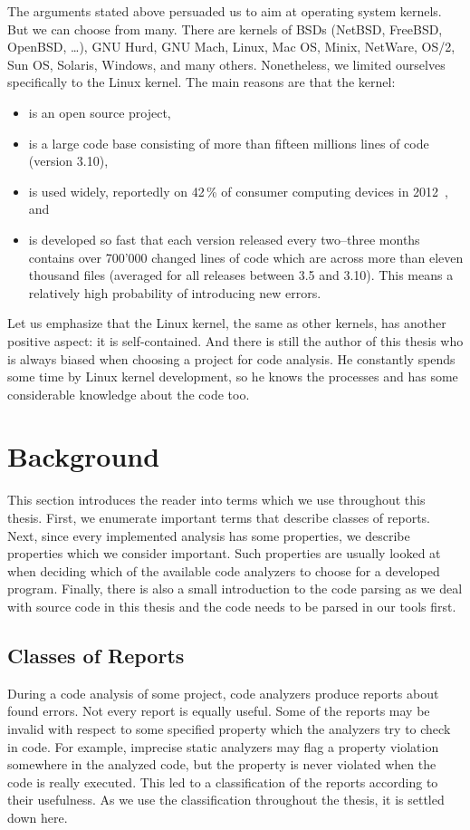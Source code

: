 The arguments stated above persuaded us to aim at operating system kernels.
But we can choose from many. There are kernels of BSDs (NetBSD, FreeBSD,
OpenBSD, \dots), GNU Hurd, GNU Mach, Linux, Mac OS, Minix, NetWare, OS/2, Sun
OS, Solaris, Windows, and many others. Nonetheless, we limited ourselves
specifically to the Linux kernel. The main reasons are that the kernel:
\begin{itemize} \item is an open source project,

\item is a large code base consisting of more than fifteen millions lines of
code (version 3.10),

\item is used widely, reportedly on 42\,\% of consumer computing
devices in 2012~\cite{linux_42_percent}, and

\item is developed so fast that each version released every two--three months
contains over 700'000 changed lines of code which are across more than eleven
thousand files (averaged for all releases between 3.5 and 3.10). This means a
relatively high probability of introducing new errors.

\end{itemize}
Let us emphasize that the Linux kernel, the same as other kernels, has another
positive aspect: it is self-contained.  And there is still the author of this
thesis who is always biased when choosing a project for code analysis. He
constantly spends some time by Linux kernel development, so he knows the
processes and has some considerable knowledge about the code too.

\section{Background}
This section introduces the reader into terms which we use throughout this
thesis.  First, we enumerate important terms that describe classes of reports.
Next, since every implemented analysis has some properties, we describe
properties which we consider important. Such properties are usually looked at
when deciding which of the available code analyzers to choose for a developed
program. Finally, there is also a small introduction to the code parsing as we
deal with source code in this thesis and the code needs to be parsed in our
tools first.

\subsection{Classes of Reports}\label{sec:intro_reports_cls}
During a code analysis of some project, code analyzers produce reports about
found errors.  Not every report is equally useful. Some of the reports may be
invalid with respect to some specified property which the analyzers try to
check in code. For example, imprecise static analyzers may flag a property
violation somewhere in the analyzed code, but the property is never violated
when the code is really executed. This led to a classification of the reports
according to their usefulness. As we use the classification throughout the
thesis, it is settled down here.


